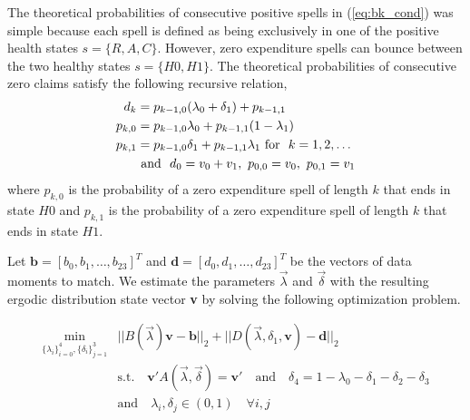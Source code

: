 \documentclass[letterpaper,12pt]{article}
\theoremstyle{definition}
\begin{document}
\begin{spacing}{1.5}{}
  The theoretical probabilities of consecutive positive spells in (\ref{eq:bk_cond}) was simple because each spell is defined as being exclusively in one of the positive health states $s = \{R, A, C\}$. However, zero expenditure spells can bounce between the two healthy states $s = \{H0, H1\}$. The theoretical probabilities of consecutive zero claims satisfy the following recursive relation,
  \begin{equation}\label{eq:model_moments}
  \begin{split}
    d_k &= p_{k-1, 0}(\lambda_0 + \delta_1) + p_{k-1, 1}\\
    p_{k, 0} &= p_{k-1, 0}\lambda_0 + p_{k-1, 1}(1 - \lambda_1) \\
    p_{k, 1} &= p_{k-1, 0}\delta_1 + p_{k-1, 1}\lambda_1 \text{\space for \space} k = 1,2,\dots \\
    &\text{\space and \space} d_0 = v_0 + v_1, \text{\space} p_{0, 0} = v_0, \text{\space} p_{0, 1} = v_1 \\  
  \end{split}
  \end{equation}
  where $p_{k,0}$ is the probability of a zero expenditure spell of length $k$ that ends in state $H0$ and $p_{k,1}$ is the probability of a zero expenditure spell of length $k$ that ends in state $H1$. 
  
  Let $\textbf{b} = [b_0, b_1, \dots, b_23]^T$ and $\textbf{d} = [d_0, d_1, \dots, d_23]^T$ be the vectors of data moments to match. We estimate the parameters $\vec{\lambda}$ and $\vec{\delta}$ with the resulting ergodic distribution state vector \textbf{v} by solving the following optimization problem.
  
  \begin{equation}\label{eq:optimization}
  \begin{split}
    \min_{\{\lambda_i\}_{i = 0}^{4}, \{\delta_i\}_{j = 1}^{3}} & \lvert\lvert B(\vec{\lambda})\textbf{v} - \textbf{b} \rvert\rvert_2 + 
    \lvert\lvert D(\vec{\lambda}, \delta_1, \textbf{v}) - \textbf{d} \rvert\rvert_2 \\
    & \text{s.t.} \quad \textbf{v}'A(\vec{\lambda}, \vec{\delta}) = \textbf{v}' \quad
    \text{and} \quad \delta_4 = 1 - \lambda_0 - \delta_1 - \delta_2 - \delta_3\\
    & \text{and} \quad \lambda_i, \delta_j \in (0, 1) \quad \forall i, j
  \end{split}
  \end{equation}


\end{spacing}
\end{document}
